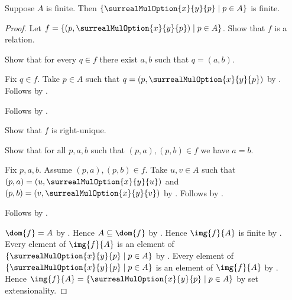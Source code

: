 \begin{lemma}\label{finite_surreal_mul_option_image}
    Suppose $A$ is finite.
    Then $\{\surrealMulOption{x}{y}{p}\mid p\in A\}$ is finite.
\end{lemma}
\begin{proof}
    Let $f=\{(p,\surrealMulOption{x}{y}{p})\mid p\in A\}$.
    Show that $f$ is a relation.
    \begin{subproof}
        Show that for every $q\in f$ there exist $a,b$ such that
            $q=(a,b)$.
        \begin{subproof}
            Fix $q\in f$.
            Take $p\in A$ such that
                $q=(p,\surrealMulOption{x}{y}{p})$
                by .
            Follows by \auto.
        \end{subproof}
        Follows by .
    \end{subproof}
    Show that $f$ is right-unique.
    \begin{subproof}
        Show that for all $p,a,b$ such that $(p,a),(p,b)\in f$
            we have $a=b$.
        \begin{subproof}
            Fix $p,a,b$.
            Assume $(p,a),(p,b)\in f$.
            Take $u,v\in A$ such that
                $(p,a)=(u,\surrealMulOption{x}{y}{u})$ and
                $(p,b)=(v,\surrealMulOption{x}{y}{v})$
                by .
            Follows by .
        \end{subproof}
        Follows by .
    \end{subproof}
    $\dom{f}=A$ by .
    Hence $A\subseteq\dom{f}$ by .
    Hence $\img{f}{A}$ is finite by .
    Every element of $\img{f}{A}$ is an element of
        $\{\surrealMulOption{x}{y}{p}\mid p\in A\}$
        by .
    Every element of $\{\surrealMulOption{x}{y}{p}\mid p\in A\}$ is an
        element of $\img{f}{A}$ by .
    Hence $\img{f}{A}=\{\surrealMulOption{x}{y}{p}\mid p\in A\}$
        by set extensionality.
\end{proof}


